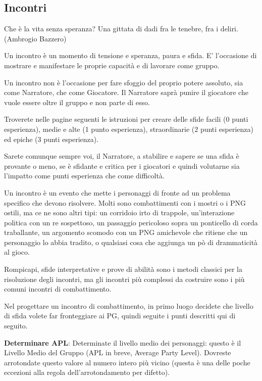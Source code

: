 \documentclass[a4paper,11pt,twoside,openany]{book}
\begin{document}
\subsection{Incontri}


\begin{tcolorbox}[enhanced,arc=5pt,boxrule=0.3pt]{Che è la vita senza speranza? Una gittata di dadi fra le tenebre, fra i deliri. (Ambrogio Bazzero)}\end{tcolorbox}\medskip

\label{incontri}

Un incontro è un momento di tensione e speranza, paura e sfida. E' l'occasione di mostrare e manifestare le proprie capacità e di lavorare come gruppo.

Un incontro non è l'occasione per fare sfoggio del proprio potere assoluto, sia come Narratore, che come Giocatore. Il Narratore saprà punire il giocatore che vuole essere oltre il gruppo e non parte di esso.

Troverete nelle pagine seguenti le istruzioni per creare delle sfide facili (0 punti esperienza), medie e alte (1 punto esperienza), straordinarie (2 punti esperienza) ed epiche (3 punti esperienza).

Sarete comunque sempre voi, il Narratore, a stabilire e sapere se una sfida è provante o meno, se è sfidante e critica per i giocatori e quindi volutarne sia l'impatto come punti esperienza che come difficoltà.

Un incontro è un evento che mette i personaggi di fronte ad un problema specifico che devono risolvere. Molti sono combattimenti con i mostri o i PNG ostili, ma ce ne sono altri tipi: un corridoio irto di trappole, un'interazione politica con un re sospettoso, un passaggio pericoloso sopra un ponticello di corda traballante, un argomento scomodo con un PNG amichevole che ritiene che un personaggio lo abbia tradito, o qualsiasi cosa che aggiunga un pò di drammaticità al gioco.

Rompicapi, sfide interpretative e prove di abilità sono i metodi classici per la risoluzione degli incontri, ma gli incontri più complessi da costruire sono i più comuni incontri di combattimento.

Nel progettare un incontro di combattimento, in primo luogo decidete che livello di sfida volete far fronteggiare ai PG, quindi seguite i punti descritti qui di seguito.

\textbf{Determinare APL}: Determinate il livello medio dei personaggi: questo è il Livello Medio del Gruppo (APL in breve, Average Party Level). Dovreste arrotondate questo valore al numero intero più vicino (questa è una delle poche eccezioni alla regola dell'arrotondamento per difetto).
\end{document}
